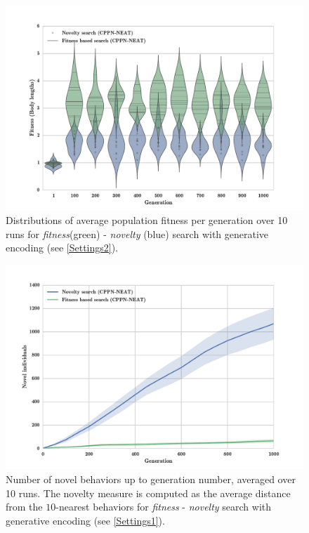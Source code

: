 \begin{figure}
\centering
\includegraphics[width=1.0\textwidth]{../Figures/Results/ViolinPlotsAvgGenFitSize5.pdf}
\caption{Distributions of average population fitness per generation over 10 runs for \emph{fitness}(green) - \emph{novelty} (blue) search with generative encoding (see \ref{Settings2}).}
\label{fig:ViolinPlotsAvgGenFitSize5}
\end{figure}


\begin{figure}
\centering
\includegraphics[width=1.0\textwidth]{../Figures/Results/novelIndividualsFitNovComp.pdf}
\caption{Number of novel behaviors up to generation number, averaged over 10 runs. The novelty measure is computed as the average distance from the $10$-nearest behaviors for \emph{fitness} - \emph{novelty} search with generative encoding (see \ref{Settings1}).}
\label{fig:novelIndividualsFitNovComp}
\end{figure}


